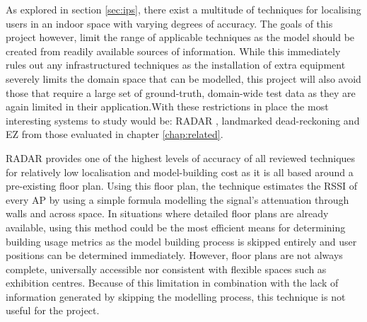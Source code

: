 \documentclass{UoYCSproject}
\begin{document}
        As explored in section \ref{sec:ips}, there exist a multitude of techniques for localising users in an indoor space with varying degrees of accuracy. The goals of this project however, limit the range of applicable techniques as the model should be created from readily available sources of information. While this immediately rules out any infrastructured techniques as the installation of extra equipment severely limits the domain space that can be modelled, this project will also avoid those that require a large set of ground-truth, domain-wide test data as they are again limited in their application.With these restrictions in place the most interesting systems to study would be: RADAR \citep{bahl2000radar}, landmarked dead-reckoning \citep{wang2012no} and EZ \citep{chintalapudi2010indoor} from those evaluated in chapter \ref{chap:related}.
        
        RADAR provides one of the highest levels of accuracy of all reviewed techniques for relatively low localisation and model-building cost as it is all based around a pre-existing floor plan. Using this floor plan, the technique estimates the RSSI of every AP by using a simple formula modelling the signal's attenuation through walls and across space. In situations where detailed floor plans are already available, using this method could be the most efficient means for determining building usage metrics as the model building process is skipped entirely and user positions can be determined immediately. However, floor plans are not always complete, universally accessible nor consistent with flexible spaces such as exhibition centres. Because of this limitation in combination with the lack of information generated by skipping the modelling process, this technique is not useful for the project.
        
\end{document}
